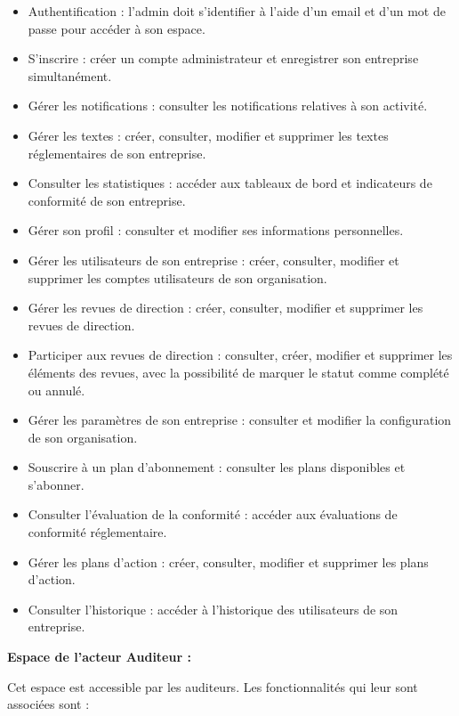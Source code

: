 \begin{itemize}
  \item Authentification : l'admin doit s'identifier à l'aide d'un email et d'un mot de passe pour accéder à son espace.
  \item S'inscrire : créer un compte administrateur et enregistrer son entreprise simultanément.
  \item Gérer les notifications : consulter les notifications relatives à son activité.
  \item Gérer les textes : créer, consulter, modifier et supprimer les textes réglementaires de son entreprise.
  \item Consulter les statistiques : accéder aux tableaux de bord et indicateurs de conformité de son entreprise.
  \item Gérer son profil : consulter et modifier ses informations personnelles.
  \item Gérer les utilisateurs de son entreprise : créer, consulter, modifier et supprimer les comptes utilisateurs de son organisation.
  \item Gérer les revues de direction : créer, consulter, modifier et supprimer les revues de direction.
  \item Participer aux revues de direction : consulter, créer, modifier et supprimer les éléments des revues, avec la possibilité de marquer le statut comme complété ou annulé.
  \item Gérer les paramètres de son entreprise : consulter et modifier la configuration de son organisation.
  \item Souscrire à un plan d'abonnement : consulter les plans disponibles et s'abonner.
  \item Consulter l'évaluation de la conformité : accéder aux évaluations de conformité réglementaire.
  \item Gérer les plans d'action : créer, consulter, modifier et supprimer les plans d'action.
  \item Consulter l'historique : accéder à l'historique des utilisateurs de son entreprise.
\end{itemize}

\noindent\textbf{Espace de l'acteur Auditeur :}

\noindent Cet espace est accessible par les auditeurs. Les fonctionnalités qui leur sont associées sont :

